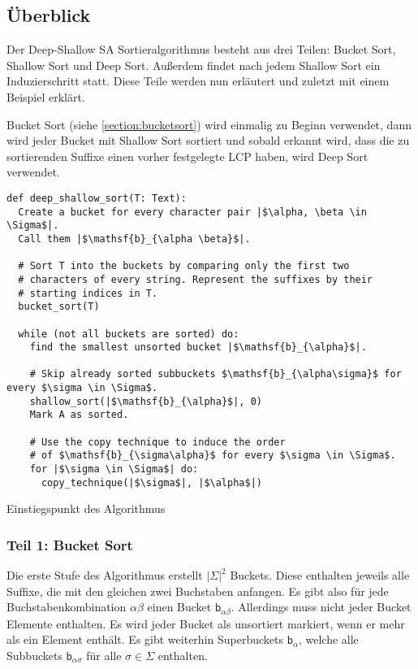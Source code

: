 \subsection{Überblick}

Der Deep-Shallow SA Sortieralgorithmus besteht aus drei Teilen: Bucket Sort, Shallow Sort und Deep Sort.
Außerdem findet nach jedem Shallow Sort ein Induzierschritt statt.
Diese Teile werden nun erläutert und zuletzt mit einem Beispiel erklärt.

Bucket Sort (siehe \cref{section:bucketsort}) wird einmalig zu Beginn verwendet,
dann wird jeder Bucket mit Shallow Sort sortiert und
sobald erkannt wird, dass die zu sortierenden Suffixe einen vorher festgelegte LCP
haben, wird Deep Sort verwendet.

\begin{listing}
\begin{verbatim}
def deep_shallow_sort(T: Text):
  Create a bucket for every character pair |$\alpha, \beta \in \Sigma$|.
  Call them |$\mathsf{b}_{\alpha \beta}$|.

  # Sort T into the buckets by comparing only the first two
  # characters of every string. Represent the suffixes by their
  # starting indices in T.
  bucket_sort(T)

  while (not all buckets are sorted) do:
    find the smallest unsorted bucket |$\mathsf{b}_{\alpha}$|.
    
    # Skip already sorted subbuckets $\mathsf{b}_{\alpha\sigma}$ for every $\sigma \in \Sigma$.
    shallow_sort(|$\mathsf{b}_{\alpha}$|, 0)
    Mark A as sorted.

    # Use the copy technique to induce the order
    # of $\mathsf{b}_{\sigma\alpha}$ for every $\sigma \in \Sigma$.
    for |$\sigma \in \Sigma$| do:
      copy_technique(|$\sigma$|, |$\alpha$|)
\end{verbatim}
\caption{Einstiegspunkt des Algorithmus}
\label{ds:alg:main}
\end{listing}

\subsubsection{Teil 1: Bucket Sort}

Die erste Stufe des Algorithmus erstellt $|\Sigma|^2$ Buckets.
Diese enthalten jeweils alle Suffixe, die mit den gleichen zwei Buchstaben anfangen.
Es gibt also für jede Buchstabenkombination $\alpha\beta$ einen Bucket $\mathsf{b}_{\alpha\beta}$.
Allerdings muss nicht jeder Bucket Elemente enthalten.
Es wird jeder Bucket als unsortiert markiert, wenn er mehr als ein Element enthält.
Es gibt weiterhin Superbuckets $\mathsf{b}_\alpha$, welche alle Subbuckets $\mathsf{b}_{\alpha\sigma}$ für alle $\sigma \in \Sigma$ enthalten.

